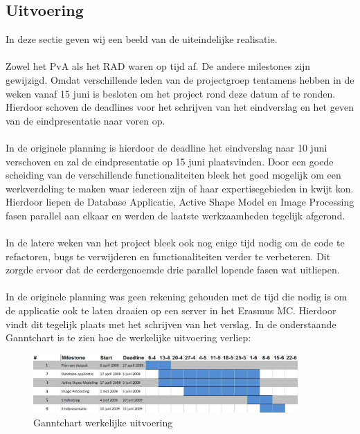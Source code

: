 \subsection{Uitvoering}
\label{werkelijke_planning}
In deze sectie geven wij een beeld van de uiteindelijke realisatie.
\\
\\
Zowel het PvA als het RAD waren op tijd af. De andere milestones zijn
gewijzigd. Omdat verschillende leden van de projectgroep tentamens
hebben in de weken vanaf 15 juni is besloten om het project rond deze datum af
te ronden. Hierdoor schoven de deadlines voor het schrijven van het eindverslag
en het geven van de eindpresentatie naar voren op.
\\
\\
In de originele planning is hierdoor de deadline het eindverslag naar 10 juni verschoven en zal de eindpresentatie op 15 juni plaatsvinden.
Door een goede scheiding van de verschillende functionaliteiten bleek het goed mogelijk om een werkverdeling te maken waar iedereen zijn of haar expertisegebieden in kwijt kon.
Hierdoor liepen de Database Applicatie, Active Shape Model en Image Processing fasen parallel aan elkaar en werden de laatste werkzaamheden tegelijk afgerond.
\\
\\
In de latere weken van het project bleek ook nog enige tijd nodig om de code te
refactoren, bugs te verwijderen en functionaliteiten verder te verbeteren. Dit
zorgde ervoor dat de eerdergenoemde drie parallel lopende fasen wat uitliepen.
\\
\\
In de originele planning was geen rekening gehouden met de tijd die nodig is om
de applicatie ook te laten draaien op een server in het Erasmus MC. Hierdoor
vindt dit tegelijk plaats met het schrijven van het verslag.
In de onderstaande Ganntchart is te zien hoe de werkelijke uitvoering verliep:
\\
\begin{figure}[ht]
\includegraphics[width=0.9\textwidth]{ganntafter}
\caption{Ganntchart werkelijke uitvoering}
\label{fig:ganntafter}
\end{figure}
